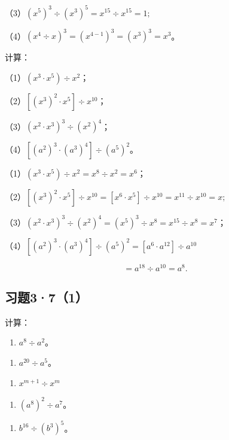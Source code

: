 （3）\((x^{5})^{3} \div (x^{3})^{5} = x^{15} \div x^{15} = 1;\)

（4）\((x^{4} \div x)^{3} = (x^{4-1})^{3} = (x^{3})^{3} = x^{3}\)。

 计算：

（1）\((x^{3} \cdot x^{5}) \div x^{2}\)；

（2）\(\left[(x^3)^2 \cdot x^5\right] \div x^{10}\)；

（3）\((x^{2} \cdot x^{3})^{3} \div (x^{2})^{4}\)；

（4）\(\left[(a^2)^3 \cdot (a^3)^4\right] \div (a^5)^2\)。

（1）\((x^{3} \cdot x^{5}) \div x^{2} = x^{8} \div x^{2} = x^{6}\)；

（2）\(\left[(x^3)^2 \cdot x^5\right] \div x^{10} = [x^6 \cdot x^5] \div x^{10} = x^{11} \div x^{10} = x;\)

（3）\((x^{2} \cdot x^{3})^{3} \div (x^{2})^{4} = (x^{5})^{3} \div x^{8} = x^{15} \div x^{8} = x^{7}\)；

（4）\(\left[(a^2)^3 \cdot (a^3)^4\right] \div (a^5)^2 = [a^6 \cdot a^{12}] \div a^{10}\)

\[
= a ^{18} \div a ^{10} = a ^{8}.
\]

\subsection{习题3·7（1）}

计算：

\begin{enumerate}[start=1]
\item
  \(a^8 \div a^2\)。
\end{enumerate}

\begin{enumerate}[start=3]
\item
  \(a^{20} \div a^5\)。
\end{enumerate}

\begin{enumerate}[start=5]
\item
  \(x^{m + 1}\div x^{m}\)
\end{enumerate}

\begin{enumerate}[start=7]
\item
  \((a^8)^2 \div a^7\)。
\end{enumerate}

\begin{enumerate}[start=9]
\item
  \(b^{16} \div (b^3)^5\)。
\end{enumerate}

